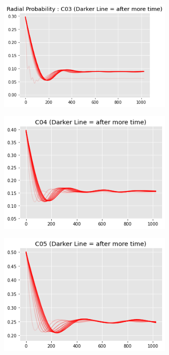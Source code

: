 \documentclass[12pt, a4paper]{report}
\begin{document}
\begin{figure}[H]
\centering
\begin{subfigure}{.48\textwidth}
  \centering
  \includegraphics[width=0.95\textwidth]{Pictures/MSFeatures/RadialCorrTime1.png}
  \label{img:microstrImg}
\end{subfigure}
\begin{subfigure}{.48\textwidth}
  \centering
  \includegraphics[width=0.95\textwidth]{Pictures/MSFeatures/radialCorrTime2.png}
  \label{img:microstrImg}
\end{subfigure}
\begin{subfigure}{.48\textwidth}
  \centering
  \includegraphics[width=0.95\textwidth]{Pictures/MSFeatures/RadialCorrTime3.png}
  \label{img:microstrImg}
\end{subfigure}


\end{figure}
\end{document}
